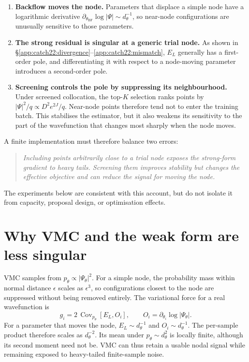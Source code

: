 \begin{enumerate}
\item \textbf{Backflow moves the node.}
  Parameters that displace a simple node have a logarithmic derivative
  $\partial_{\theta_{\mathrm{BF}}}\log|\Psi|\sim d_\theta^{-1}$, so
  near-node configurations are unusually sensitive to those parameters.

\item \textbf{The strong residual is singular at a generic trial node.}
  As shown in \S\ref{app:catch22:divergence}--\ref{app:catch22:mismatch},
  $E_L$ generally has a first-order pole, and differentiating it with respect
  to a node-moving parameter introduces a second-order pole.

\item \textbf{Screening controls the pole by suppressing its neighbourhood.}
  Under screened collocation, the top-$K$ selection ranks points by
  $|\Psi|^2/q\propto D^2 e^{2J}/q$.
  Near-node points therefore tend not to enter the training batch. This stabilises
  the estimator, but it also weakens its sensitivity to the part of the wavefunction
  that changes most sharply when the node moves.
\end{enumerate}

\noindent
A finite implementation must therefore balance two errors:
\begin{quote}
\emph{Including points arbitrarily close to a trial node exposes the strong-form
gradient to heavy tails. Screening them improves stability but changes the effective
objective and can reduce the signal for moving the node.}
\end{quote}
The experiments below are consistent with this account, but do not isolate it from
capacity, proposal design, or optimisation effects.


\section{Why VMC and the weak form are less singular}
\label{app:catch22:vmc}

VMC samples from $p_\theta\propto|\Psi_\theta|^2$. For a simple node, the
probability mass within normal distance $\epsilon$ scales as $\epsilon^3$, so configurations
closest to the node are suppressed without being removed entirely. The variational force
for a real wavefunction is
\begin{equation}
g_i=2\,\operatorname{Cov}_{p_\theta}[E_L,O_i],
\qquad O_i=\partial_{\theta_i}\log|\Psi_\theta|.
\label{eq:c22:vmc-force}
\end{equation}
For a parameter that moves the node, $E_L\sim d_\theta^{-1}$ and
$O_i\sim d_\theta^{-1}$. The per-sample product therefore scales as
$d_\theta^{-2}$. Its mean under $p_\theta\sim d_\theta^2$ is locally finite,
although its second moment need not be. VMC can thus retain a usable nodal signal while
remaining exposed to heavy-tailed finite-sample noise.

